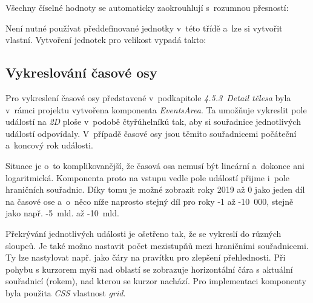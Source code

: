 \documentclass[a4paper,12pt]{article}
\begin{document}


Všechny číselné hodnoty se automaticky zaokrouhlují s~rozumnou přesností:



Není nutné používat předdefinované jednotky v~této třídě a~lze si vytvořit vlastní. Vytvoření jednotek pro velikost vypadá takto:



\subsection{Vykreslování časové osy}

Pro vykreslení časové osy představené v~podkapitole \textit{4.5.3~Detail tělesa} byla v~rámci projektu vytvořena komponenta \textit{EventsArea}. Ta umožňuje vykreslit pole událostí na \textit{2D} ploše v~podobě čtyřúhelníků tak, aby si souřadnice jednotlivých událostí odpovídaly. V~případě časové osy jsou těmito souřadnicemi počáteční a~koncový rok události.

Situace je o~to komplikovanější, že časová osa nemusí být lineární a~dokonce ani logaritmická. Komponenta proto na vstupu vedle pole událostí přijme i~pole hraničních souřadnic. Díky tomu je možné zobrazit roky 2019 až 0 jako jeden díl na časové ose a~o~něco níže naprosto stejný díl pro roky -1 až -10~000, stejně jako např. -5~mld. až -10~mld.

Překrývání jednotlivých události je ošetřeno tak, že se vykreslí do různých sloupců. Je také možno nastavit počet mezistupňů mezi hraničními souřadnicemi. Ty lze nastylovat např. jako čáry na pravítku pro zlepšení přehlednosti. Při pohybu s kurzorem myši nad oblastí se zobrazuje horizontální čára s aktuální souřadnicí (rokem), nad kterou se kurzor nachází. Pro implementaci komponenty byla použita \textit{CSS} vlastnost \textit{grid}.





\clearpage {} {}
\end{document}
